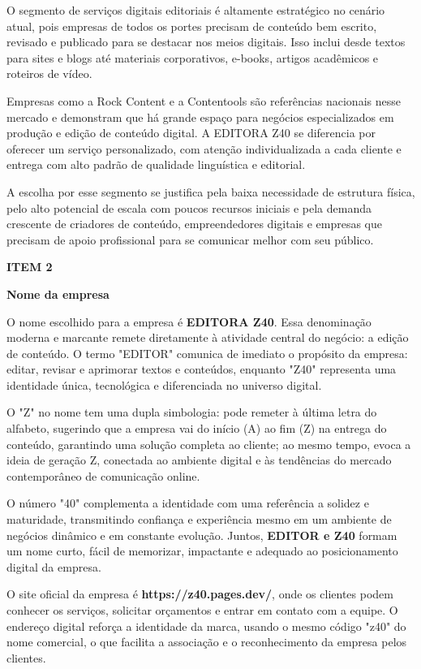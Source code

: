 \documentclass[10pt,a4paper]{article}
\newcommand{\zsiteplain}{https://\allowbreak{}z40.pages\allowbreak{}.dev/\allowbreak{}}
\newcommand{\zsite}{\textbf{\zsiteplain}}
\newcommand{\labelfont}{\fontsize{5.8}{7.5}\selectfont\bfseries\addfontfeatures{LetterSpace=15}}
\newcommand{\headingfont}{\fontsize{9.8}{12}\selectfont\bfseries\color{navy}}
\newcommand{\separador}{\vspace{16pt}{\color{rulegray}\rule{\linewidth}{0.6pt}}\vspace{10pt}}
\newcommand{\itemh}[2]{\needspace{6\baselineskip}%
  {\labelfont\color{graylab}ITEM #1}\par\vspace{5pt}%
  {\headingfont #2}\par\vspace{8pt}}
\begin{document}
O segmento de serviços digitais editoriais é altamente estratégico no cenário atual, pois empresas de todos os portes precisam de conteúdo bem escrito, revisado e publicado para se destacar nos meios digitais. Isso inclui desde textos para sites e blogs até materiais corporativos, e-books, artigos acadêmicos e roteiros de vídeo.

Empresas como a Rock Content e a Contentools são referências nacionais nesse mercado e demonstram que há grande espaço para negócios especializados em produção e edição de conteúdo digital. A EDITORA Z40 se diferencia por oferecer um serviço personalizado, com atenção individualizada a cada cliente e entrega com alto padrão de qualidade linguística e editorial.

A escolha por esse segmento se justifica pela baixa necessidade de estrutura física, pelo alto potencial de escala com poucos recursos iniciais e pela demanda crescente de criadores de conteúdo, empreendedores digitais e empresas que precisam de apoio profissional para se comunicar melhor com seu público.

\separador
\itemh{2}{Nome da empresa}

O nome escolhido para a empresa é \textbf{EDITORA Z40}. Essa denominação moderna e marcante remete diretamente à atividade central do negócio: a edição de conteúdo. O termo "EDITOR" comunica de imediato o propósito da empresa: editar, revisar e aprimorar textos e conteúdos, enquanto "Z40" representa uma identidade única, tecnológica e diferenciada no universo digital.

O "Z" no nome tem uma dupla simbologia: pode remeter à última letra do alfabeto, sugerindo que a empresa vai do início (A) ao fim (Z) na entrega do conteúdo, garantindo uma solução completa ao cliente; ao mesmo tempo, evoca a ideia de geração Z, conectada ao ambiente digital e às tendências do mercado contemporâneo de comunicação online.

O número "40" complementa a identidade com uma referência a solidez e maturidade, transmitindo confiança e experiência mesmo em um ambiente de negócios dinâmico e em constante evolução. Juntos, \textbf{EDITOR e Z40} formam um nome curto, fácil de memorizar, impactante e adequado ao posicionamento digital da empresa.

O site oficial da empresa é \zsite, onde os clientes podem conhecer os serviços, solicitar orçamentos e entrar em contato com a equipe. O endereço digital reforça a identidade da marca, usando o mesmo código "z40" do nome comercial, o que facilita a associação e o reconhecimento da empresa pelos clientes.
\end{document}
